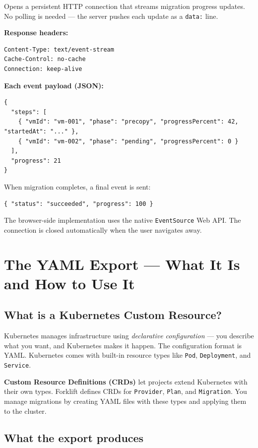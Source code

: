 \documentclass[12pt,a4paper]{article}
\begin{document}
Opens a persistent HTTP connection that streams migration progress updates. No polling is needed — the server pushes each update as a \texttt{data:} line.

\textbf{Response headers:}
\begin{lstlisting}[language={}]
Content-Type: text/event-stream
Cache-Control: no-cache
Connection: keep-alive
\end{lstlisting}

\textbf{Each event payload (JSON):}
\begin{lstlisting}[language={}]
{
  "steps": [
    { "vmId": "vm-001", "phase": "precopy", "progressPercent": 42, "startedAt": "..." },
    { "vmId": "vm-002", "phase": "pending", "progressPercent": 0 }
  ],
  "progress": 21
}
\end{lstlisting}

When migration completes, a final event is sent:
\begin{lstlisting}[language={}]
{ "status": "succeeded", "progress": 100 }
\end{lstlisting}

The browser-side implementation uses the native \texttt{EventSource} Web API. The connection is closed automatically when the user navigates away.

\section{The YAML Export — What It Is and How to Use It}
\label{sec:yaml}

\subsection{What is a Kubernetes Custom Resource?}

Kubernetes manages infrastructure using \emph{declarative configuration} — you describe what you want, and Kubernetes makes it happen. The configuration format is YAML. Kubernetes comes with built-in resource types like \texttt{Pod}, \texttt{Deployment}, and \texttt{Service}.

\textbf{Custom Resource Definitions (CRDs)} let projects extend Kubernetes with their own types. Forklift defines CRDs for \texttt{Provider}, \texttt{Plan}, and \texttt{Migration}. You manage migrations by creating YAML files with these types and applying them to the cluster.

\subsection{What the export produces}
\end{document}
